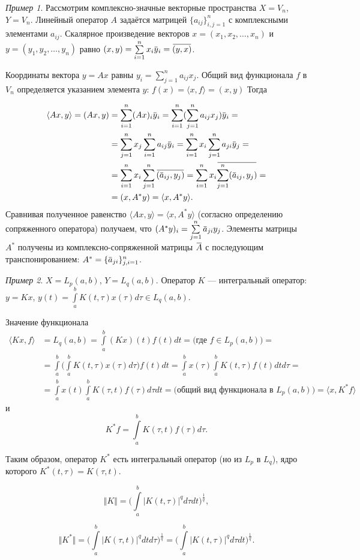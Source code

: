 \documentclass[12pt,a4paper,titlepage,oneside]{book}
\newcommand{\overbar}[1]{\mkern 1.5mu\overline{\mkern-1.5mu#1\mkern-1.5mu}\mkern 1.5mu}
\theoremstyle{definition}
\theoremstyle{plain}
\theoremstyle{break}
\theoremstyle{remark}
\theoremstyle{remark}
\newtheorem*{example}{Пример}
\theoremstyle{remark}
\theoremstyle{remark}
\theoremstyle{plain}
\theoremstyle{plain}
\begin{document}
\begin{example}
Рассмотрим комплексно-значные векторные пространства $X=V_n$, $Y=V_n$. Линейный оператор $A$ задаётся матрицей $\lbrace a_{ij} \rbrace_{i,j=1}^n$ с комплексными элементами $a_{ij}$. Скалярное произведение векторов $x = (x_1,x_2,\ldots,x_n)$ и $y = (y_1,y_2,\ldots,y_n)$ равно $(x,y) = \sum\limits_{i=1}^n x_i \overbar{y}_i = \overbar{(y,x)}$.

Координаты вектора $y=Ax$ равны $y_i = \sum\limits_{j=1}^n a_{ij} x_j$. Общий вид функционала $f$ в $V_n$ определяется указанием элемента $y$: $f(x) = \langle x,f \rangle = (x,y)$
Тогда

\begin{align*}
\langle Ax,y \rangle = (Ax,y) &= \sum\limits_{i=1}^n (Ax)_i \overbar{y}_i = \sum\limits_{i=1}^n (\sum\limits_{j=1}^n a_{ij}x_j)\overbar{y}_i =\\
&= \sum\limits_{j=1}^n x_j \sum\limits_{i=1}^n a_{ij}\overbar{y}_i = \sum\limits_{i=1}^n x_i \sum\limits_{j=1}^n a_{ji}\overbar{y}_j =\\
&= \sum\limits_{i=1}^n x_i \sum\limits_{j=1}^n \overbar{(\overbar{a}_{ij},y_j)} = \sum\limits_{i=1}^n x_i \overbar{\sum\limits_{j=1}^n(\overbar{a}_{ij} ,y_j)} =\\
&= (x,A^{*}y)=\langle x, A^{*}y \rangle.
\end{align*} 
Сравнивая полученное равенство $\langle Ax,y \rangle = \langle x, A^{*}y \rangle$ (согласно определению сопряженного оператора) получаем, что
$(A^{*}y)_i = \sum\limits_{j=1}^n \overbar{a}_{ji} y_j$.
Элементы матрицы $A^{*}$ получены из комплексно-сопряженной матрицы $\overbar{A}$ с последующим транспонированием: $A^{*}=\{\overbar{a}_{ji}\}_{j,i=1}^n$.
\end{example}

\begin{example}
$X=L_p(a,b)$, $Y=L_q(a,b)$. Оператор $K$ --- интегральный оператор: $y=Kx$, $y(t)=\displaystyle\int\limits_a^b K(t,\tau)x(\tau)d\tau \in L_q(a,b)$.

Значение функционала
\begin{align*}
\langle Kx,f \rangle &= L_q(a,b)=\int\limits_a^b (Kx)(t)f(t)dt = \mbox{(где $f \in L_p(a,b)$)} = \\
&= \int\limits_a^b \Big( \int\limits_a^b K(t,\tau)x(\tau)d\tau \Big) f(t)dt = \int\limits_a^b x(\tau) \int\limits_a^b K(t,\tau)f(t)dt d\tau =\\
&= \int\limits_a^b x(t) \int\limits_a^b K(\tau,t)f(\tau)d\tau dt = \mbox{(общий вид функционала в $L_p(a,b)$)} = \langle x,K^{*}f \rangle
\end{align*}
и
$$K^{*}f=\int\limits_a^b K(\tau, t)f(\tau)d\tau.$$

Таким образом, оператор $K^{*}$ есть интегральный оператор (но из $L_p$ в $L_q$), ядро которого $K^{*}(t,\tau)=K(\tau,t)$.

$$\Vert K \Vert = \Big( \displaystyle\int\limits_a^b \lvert K(t,\tau) \rvert^q d\tau dt  \Big)^{\frac{1}{q}},$$

$$\Vert K^{*} \Vert =  \Big( \displaystyle\int\limits_a^b \lvert K(\tau, t) \rvert^q dt d\tau  \Big)^{\frac{1}{q}} =  \Big( \displaystyle\int\limits_a^b \lvert K(t,\tau) \rvert^q d\tau dt  \Big)^{\frac{1}{q}}.$$
\end{example}
\end{document}
